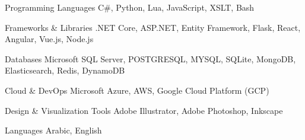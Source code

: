 

\begin{cvskills}

  \cvskill
    {Programming Languages} %
    {C\#, Python, Lua, JavaScript, XSLT, Bash} %

  \cvskill
    {Frameworks \& Libraries} %
    {.NET Core, ASP.NET, Entity Framework, Flask, React, Angular, Vue.js, Node.js} %

  \cvskill
    {Databases} %
    {Microsoft SQL Server, POSTGRESQL, MYSQL, SQLite, MongoDB, Elasticsearch, Redis, DynamoDB} %

  \cvskill
    {Cloud \& DevOps} %
    {Microsoft Azure, AWS, Google Cloud Platform (GCP)} %

  \cvskill
    {Design \& Visualization Tools} %
    {Adobe Illustrator, Adobe Photoshop, Inkscape} %

  \cvskill
    {Languages} %
    {Arabic, English} %

\end{cvskills}

